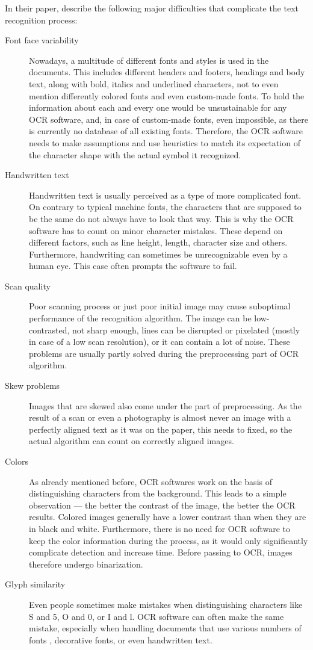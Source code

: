 In their paper, \citet{preprocessAll} describe the following major difficulties that complicate the text recognition process:

\begin{description}
\item[Font face variability] Nowadays, a multitude of different fonts and styles is used in the documents. This includes different headers and footers, headings and body text, along with bold, italics and underlined characters, not to even mention differently colored fonts and even custom-made fonts. To hold the information about each and every one would be unsustainable for any OCR software, and, in case of custom-made fonts, even impossible, as there is currently no database of all existing fonts. Therefore, the OCR software needs to make assumptions and use heuristics to match its expectation of the character shape with the actual symbol it recognized.
\item[Handwritten text] Handwritten text is usually perceived as a type of more complicated font. On contrary to typical machine fonts, the characters that are supposed to be the same do not always have to look that way. This is why the OCR software has to count on minor character mistakes. These depend on different factors, such as line height, length, character size and others. Furthermore, handwriting can sometimes be unrecognizable even by a human eye. This case often prompts the software to fail.
\item[Scan quality] Poor scanning process or just poor initial image may cause suboptimal performance of the recognition algorithm. The image can be low-contrasted, not sharp enough, lines can be disrupted or pixelated (mostly in case of a low scan resolution), or it can contain a lot of noise. These problems are usually partly solved during the preprocessing part of OCR algorithm.
\item[Skew problems] Images that are skewed also come under the part of preprocessing. As the result of a scan or even a photography is almost never an image with a perfectly aligned text as it was on the paper, this needs to fixed, so the actual algorithm can count on correctly aligned images.
\item[Colors] As already mentioned before, OCR softwares work on the basis of distinguishing characters from the background. This leads to a simple observation --- the better the contrast of the image, the better the OCR results. Colored images generally have a lower contrast than when they are in black and white. Furthermore, there is no need for OCR software to keep the color information during the process, as it would only significantly complicate detection and increase time. Before passing to OCR, images therefore undergo binarization.
\item[Glyph similarity] Even people sometimes make mistakes when distinguishing characters like S and 5, O and 0, or I and l. OCR software can often make the same mistake, especially when handling documents that use various numbers of fonts , decorative fonts, or even  handwritten text.
\end{description}

